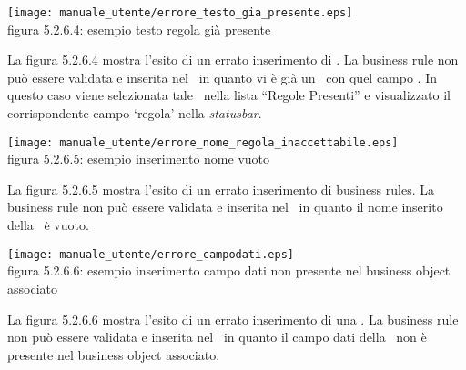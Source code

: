 \begin{center}
\texttt{[image: manuale\_utente/errore\_testo\_gia\_presente.eps]}\\
 figura 5.2.6.4: esempio testo regola gi\`a presente
\end{center} 
La figura 5.2.6.4 mostra l'esito di un errato inserimento di \br. La business rule non pu\`o essere validata e inserita nel \rp\ in quanto vi \`e gi\`a un \br\ con quel campo . In questo caso viene selezionata tale \br\ nella lista ``Regole Presenti'' e visualizzato il corrispondente campo `regola' nella \textit{statusbar}.

\begin{center}
\texttt{[image: manuale\_utente/errore\_nome\_regola\_inaccettabile.eps]}\\
 figura 5.2.6.5: esempio inserimento nome vuoto
\end{center} 
La figura 5.2.6.5 mostra l'esito di un errato inserimento di business rules. La business rule non pu\`o essere validata e inserita nel \rp\ in quanto il nome inserito  della \br\ \`e vuoto.

\begin{center}
\texttt{[image: manuale\_utente/errore\_campodati.eps]}\\
 figura 5.2.6.6: esempio inserimento campo dati non presente nel business object associato
\end{center} 
La figura 5.2.6.6 mostra l'esito di un errato inserimento di una \br. La business rule non pu\`o essere validata e inserita nel \rp\ in quanto il campo dati della \br\ non \`e presente nel business object associato.


